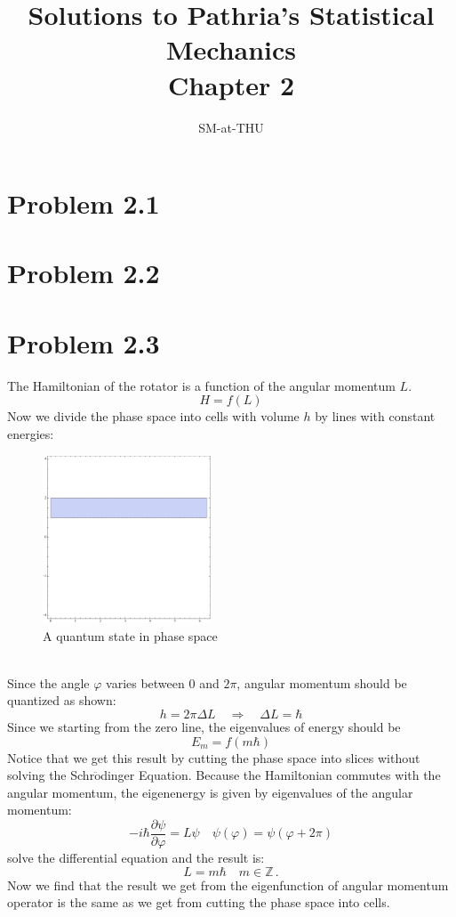 \documentclass{article}
\author{SM-at-THU}
\title{\bf{Solutions to Pathria's Statistical Mechanics}\\Chapter 2}
\begin{document}
\maketitle
\section*{Problem 2.1}

\section*{Problem 2.2}

\section*{Problem 2.3}
The Hamiltonian of the rotator is a function of the angular momentum $L$. 
$$
H = f(L)
$$
Now we divide the phase space into cells with volume $h$ by lines with constant energies:
\begin{figure}[!htp]
\centering
\includegraphics[width=5cm]{./figures/2.3-2.5/pic2.pdf}
\caption{A quantum state in phase space}
\end{figure}\\
Since the angle $\varphi$ varies between $0$ and $2\pi$, angular momentum should be quantized as shown:
$$
h = 2\pi\Delta L\quad \Rightarrow \quad \Delta L =\hbar
$$
Since we starting from the zero line, the eigenvalues of energy should be
\begin{equation}
E_m = f(m\hbar)
\end{equation}
Notice that we get this result by cutting the phase space into slices without solving the Schr$\ddot{\mathrm{o}}$dinger Equation. Because the Hamiltonian commutes with the angular momentum, the eigenenergy is given by eigenvalues of the angular momentum:
$$
-i\hbar \frac{\partial \psi}{\partial\varphi} = L\psi\quad\psi(\varphi) =\psi(\varphi+2\pi)
$$
solve the differential equation and the result is:
$$
L = m\hbar\quad m \in \mathbb{Z}\,.
$$
Now we find that the result we get from the eigenfunction of angular momentum operator is the same as we get from cutting the phase space into cells.
\end{document}
